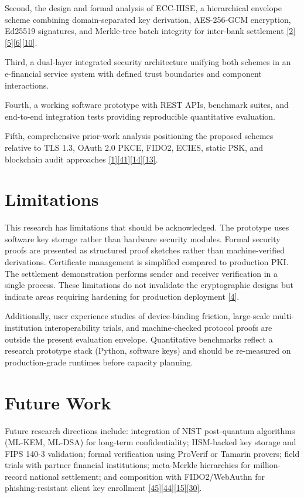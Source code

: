\indent Second, the design and formal analysis of ECC-HISE, a hierarchical envelope scheme combining domain-separated key derivation, AES-256-GCM encryption, Ed25519 signatures, and Merkle-tree batch integrity for inter-bank settlement \hyperref[ref:2]{[2]}\hyperref[ref:5]{[5]}\hyperref[ref:6]{[6]}\hyperref[ref:10]{[10]}.

\indent Third, a dual-layer integrated security architecture unifying both schemes in an e-financial service system with defined trust boundaries and component interactions.

\indent Fourth, a working software prototype with REST APIs, benchmark suites, and end-to-end integration tests providing reproducible quantitative evaluation.

\indent Fifth, comprehensive prior-work analysis positioning the proposed schemes relative to TLS 1.3, OAuth 2.0 PKCE, FIDO2, ECIES, static PSK, and blockchain audit approaches \hyperref[ref:1]{[1]}\hyperref[ref:41]{[41]}\hyperref[ref:14]{[14]}\hyperref[ref:13]{[13]}.

\section{Limitations}

\indent This research has limitations that should be acknowledged. The prototype uses software key storage rather than hardware security modules. Formal security proofs are presented as structured proof sketches rather than machine-verified derivations. Certificate management is simplified compared to production PKI. The settlement demonstration performs sender and receiver verification in a single process. These limitations do not invalidate the cryptographic designs but indicate areas requiring hardening for production deployment \hyperref[ref:4]{[4]}.

\indent Additionally, user experience studies of device-binding friction, large-scale multi-institution interoperability trials, and machine-checked protocol proofs are outside the present evaluation envelope. Quantitative benchmarks reflect a research prototype stack (Python, software keys) and should be re-measured on production-grade runtimes before capacity planning.

\section{Future Work}

\indent Future research directions include: integration of NIST post-quantum algorithms (ML-KEM, ML-DSA) for long-term confidentiality; HSM-backed key storage and FIPS 140-3 validation; formal verification using ProVerif or Tamarin provers; field trials with partner financial institutions; meta-Merkle hierarchies for million-record national settlement; and composition with FIDO2/WebAuthn for phishing-resistant client key enrollment \hyperref[ref:45]{[45]}\hyperref[ref:44]{[44]}\hyperref[ref:15]{[15]}\hyperref[ref:30]{[30]}.

